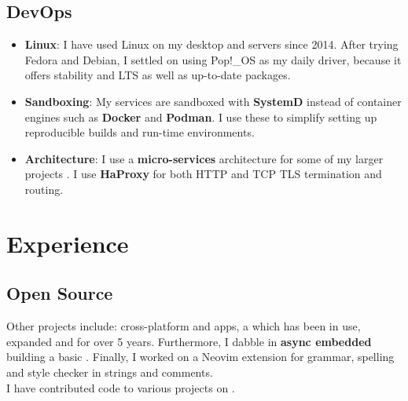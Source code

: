\subsection{DevOps}
\begin{itemize}
	\item \textbf{Linux}: I have used Linux on my desktop and servers since 2014. After trying Fedora and Debian, I settled on using Pop!\_OS as my daily driver, because it offers stability and LTS as well as up-to-date packages. 	
	\item \textbf{Sandboxing}: My services are sandboxed with \textbf{SystemD} instead of container engines such as \textbf{Docker} and \textbf{Podman}. I use these to simplify setting up reproducible builds and run-time environments.
	\item \textbf{Architecture}: I use a \textbf{micro-services} architecture for some of my larger projects . I use \textbf{HaProxy} for both HTTP and TCP TLS termination and routing.
\end{itemize}

\section{Experience}
\subsection{Open Source}

Other projects include: cross-platform  and  apps, a  which has been in use, expanded and  for over 5 years. Furthermore, I dabble in \textbf{async embedded} building a basic . Finally, I worked on a Neovim extension for grammar, spelling and style checker in strings and comments.\\
\smallskip
I have contributed code to various projects on .


